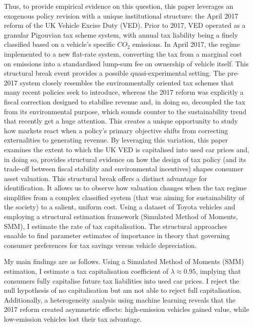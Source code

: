 \documentclass[12pt, a4paper]{article}
\begin{document}
Thus, to provide empirical evidence on this question, this paper leverages an exogenous policy revision with a unique institutional structure: the April 2017 reform of the UK Vehicle Excise Duty (VED). Prior to 2017, VED operated as a granular Pigouvian tax scheme system, with annual tax liability being a finely classified based on a vehicle’s specific $CO_{2}$ emissions. In April 2017, the regime implemented to a new flat-rate system, converting the tax from a marginal cost on emissions into a standardised lump-sum fee on ownership of vehicle itself. This structural break event provides a possible quasi-experimental setting. The pre-2017 system closely resembles the environmentally oriented tax schemes that many recent policies seek to introduce, whereas the 2017 reform was explicitly a fiscal correction designed to stabilise revenue and, in doing so, decoupled the tax from its environmental purpose, which sounds counter to the sustainability trend that recently get a huge attention. This creates a unique opportunity to study how markets react when a policy’s primary objective shifts from correcting externalities to generating revenue. By leveraging this variation, this paper examines the extent to which the UK VED is capitalised into used car prices and, in doing so, provides structural evidence on how the design of tax policy (and its trade-off between fiscal stability and environmental incentives) shapes consumer asset valuation. This structural break offers a distinct advantage for identification. It allows us to observe how valuation changes when the tax regime simplifies from a complex classified system (that was aiming for sustainability of the society) to a salient, uniform cost. Using a dataset of Toyota vehicles and employing a structural estimation framework (Simulated Method of Moments, SMM), I estimate the rate of tax capitalisation. The structural approaches enaable to find parameter estimates of importance in theory that governing consumer preferences for tax savings versus vehicle depreciation. 

My main findings are as follows. Using a Simulated Method of Moments (SMM) estimation, I estimate a tax capitalisation coefficient of $\lambda \approx 0.95$, implying that consumers fully capitalise future tax liabilities into used car prices. I reject the null hypothesis of no capitalisation but am not able to reject full capitalisation. Additionally, a heterogeneity analysis using machine learning reveals that the 2017 reform created asymmetric effects: high-emission vehicles gained value, while low-emission vehicles lost their tax advantage.
\end{document}
